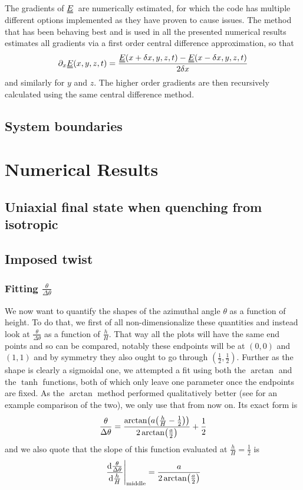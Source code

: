 \documentclass[12pt]{article}
\newcommand{\duf}[2]{\stackunder[0.5pt]{\stackunder[0.8pt]{\stackunder[1pt]{\ensuremath{#1}}{\rule{\widthof{\ensuremath{#2}}*\real{0.9}}{.1ex}}}{\rule{\widthof{\ensuremath{#2}}*\real{0.9}}{.1ex}}}{}}
\newcommand{\du}[1]{\duf{#1}{#1}}
\newcommand{\pp}{\ensuremath{\partial}}
\newcommand{\EE}{\ensuremath{\du{E}}}
\begin{document}
    The gradients of \EE\ are numerically estimated, for which the code has multiple different options implemented as they have proven to cause issues.
    The method that has been behaving best and is used in all the presented numerical results estimates all gradients via a first order central difference approximation, so that
    \begin{equation}
        \pp_x \EE(x, y, z, t) = \frac{\EE(x+\delta x, y, z, t) - \EE(x-\delta x, y, z, t)}{2\delta x}
    \end{equation}
    and similarly for $y$ and $z$.
    The higher order gradients are then recursively calculated using the same central difference method.


    \subsection{System boundaries }

\section{Numerical Results}
    \subsection{Uniaxial final state when quenching from isotropic}
    \subsection{Imposed twist}
    \subsubsection{Fitting $\frac{\theta}{\Delta\theta}$}
    We now want to quantify the shapes of the azimuthal angle $\theta$ as a function of height.
    To do that, we first of all non-dimensionalize these quantities and instead look at $\frac{\theta}{\Delta\theta}$ as a function of $\frac{h}{H}$.
    That way all the plots will have the same end points and so can be compared, notably these endpoints will be at $(0, 0)$ and $(1, 1)$ and by symmetry they also ought to go through $(\frac{1}{2}, \frac{1}{2})$.
    Further as the shape is clearly a sigmoidal one, we attempted a fit using both the $\arctan$ and the $\tanh$ functions, both of which only leave one parameter once the endpoints are fixed.
    As the $\arctan$ method performed qualitatively better (see  for an example comparison of the two), we only use that from now on.
    Its exact form is
    \begin{equation}
        \frac{\theta}{\Delta\theta} = \frac{\arctan(a \qty(\frac{h}{H} - \frac{1}{2}))}{2\arctan(\frac{a}{2})} + \frac{1}{2}
    \end{equation}
    and we also quote that the slope of this function evaluated at $\frac{h}{H} = \frac{1}{2}$ is
    \begin{equation}
        \eval{\dv{\frac{\theta}{\Delta\theta}}{\frac{h}{H}}}_\text{middle} = \frac{a}{2\arctan(\frac{a}{2})}
    \end{equation}
\end{document}
